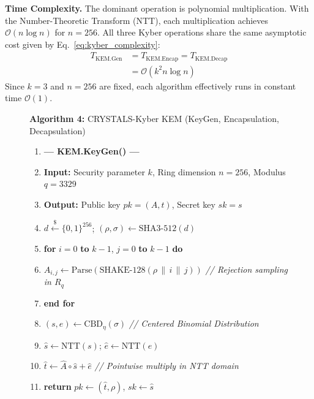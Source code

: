 \documentclass[journal, 10pt, twocolumn]{IEEEtran}
\begin{document}
\textbf{Time Complexity.} The dominant operation is polynomial multiplication. With the Number-Theoretic Transform (NTT), each multiplication achieves $\mathcal{O}(n \log n)$ for $n = 256$. All three Kyber operations share the same asymptotic cost given by Eq.~\eqref{eq:kyber_complexity}:
\begin{equation}
\begin{split}
T_{\text{KEM.Gen}} &= T_{\text{KEM.Encap}} = T_{\text{KEM.Decap}} \\
                   &= \mathcal{O}(k^2 n \log n)
\end{split}
\label{eq:kyber_complexity}
\end{equation}
Since $k = 3$ and $n = 256$ are fixed, each algorithm effectively runs in constant time $\mathcal{O}(1)$.

\begin{figure}[!t]
\hrulefill
\vspace{-0.2cm}
\begin{center}
\textbf{Algorithm 4:} CRYSTALS-Kyber KEM (KeyGen, Encapsulation, Decapsulation)
\end{center}
\vspace{-0.2cm}
\hrulefill
\begin{enumerate}
    \item[] \textbf{--- KEM.KeyGen() ---}
    \item \textbf{Input:} Security parameter $k$, Ring dimension $n = 256$, Modulus $q = 3329$
    \item \textbf{Output:} Public key $pk = (A, t)$, Secret key $sk = s$
    \item $d \xleftarrow{\$} \{0,1\}^{256}$; \quad $(\rho, \sigma) \leftarrow \text{SHA3-512}(d)$
    \item \textbf{for} $i = 0$ \textbf{to} $k-1$, $j = 0$ \textbf{to} $k-1$ \textbf{do}
    \item \quad $A_{i,j} \leftarrow \text{Parse}(\text{SHAKE-128}(\rho \,\|\, i \,\|\, j))$ \quad \textit{// Rejection sampling in $R_q$}
    \item \textbf{end for}
    \item $(s, e) \leftarrow \text{CBD}_{\eta}(\sigma)$ \quad \textit{// Centered Binomial Distribution}
    \item $\hat{s} \leftarrow \text{NTT}(s)$; \quad $\hat{e} \leftarrow \text{NTT}(e)$
    \item $\hat{t} \leftarrow \hat{A} \circ \hat{s} + \hat{e}$ \quad \textit{// Pointwise multiply in NTT domain}
    \item \textbf{return} $pk \leftarrow (\hat{t}, \rho)$, $sk \leftarrow \hat{s}$

\end{enumerate}
\end{figure}
\end{document}
